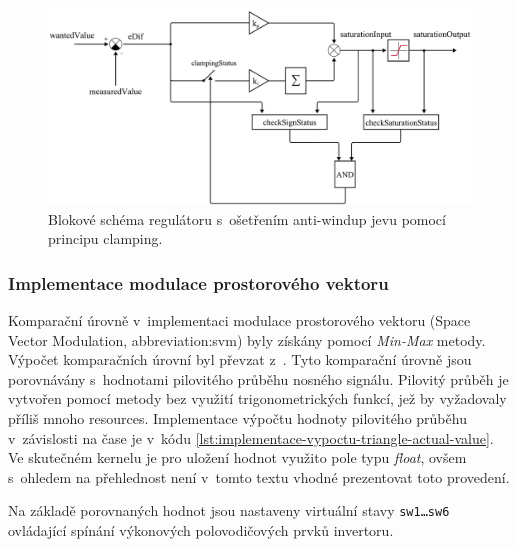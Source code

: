 \documentclass[a4paper, twoside, 11pt]{article}
\begin{document}
			\begin{figure}[htbp!]
				\centering
				\includegraphics[width=1\textwidth]{src/pdf/regulator-scheme.pdf}
			   \caption{Blokové schéma regulátoru s~ošetřením anti-windup jevu pomocí principu clamping.}
				\label{fig:regulator-scheme}
		  \end{figure}

		  \subsubsection{Implementace modulace prostorového vektoru}
		  	Komparační úrovně v~implementaci modulace prostorového vektoru (Space Vector Modulation, \gls{abbreviation:svm}) byly získány pomocí \textit{Min-Max} metody. Výpočet komparačních úrovní byl převzat z~\cite{microsemi-svm-min-max-algoritmus}. Tyto komparační úrovně jsou porovnávány s~hodnotami pilovitého průběhu nosného signálu. Pilovitý průběh je vytvořen pomocí metody bez využití trigonometrických funkcí, jež by vyžadovaly příliš mnoho resources. Implementace výpočtu hodnoty pilovitého průběhu v~závislosti na čase je v~kódu \ref{lst:implementace-vypoctu-triangle-actual-value}. Ve skutečném kernelu je pro uložení hodnot využito pole typu \textit{float}, ovšem s~ohledem na přehlednost není v~tomto textu vhodné prezentovat toto provedení.\par
			Na základě porovnaných hodnot jsou nastaveny virtuální stavy \texttt{sw1\dots sw6} ovládající spínání výkonových polovodičových prvků invertoru.
\end{document}
